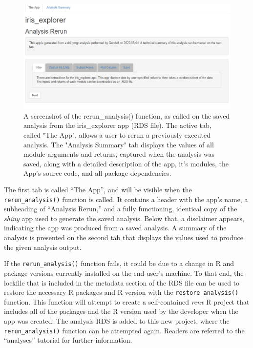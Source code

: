 \begin{figure}
\includegraphics[width=1\linewidth]{images/figure7} \caption{A screenshot of the rerun\_analysis() function, as called on the saved analysis from the iris\_explorer app (RDS file). The active tab, called "The App", allows a user to rerun a previously executed analysis. The "Analysis Summary" tab displays the values of all module arguments and returns, captured when the analysis was saved, along with a detailed description of the app, it's modules, the App's source code, and all package dependencies.}\label{fig:fig7}
\end{figure}

The first tab is called ``The App'', and will be visible when the \texttt{rerun\_analysis()} function is called. It contains a header with the app's name, a subheading of ``Analysis Rerun,'' and a fully functioning, identical copy of the \emph{shiny} app used to generate the saved analysis. Below that, a disclaimer appears, indicating the app was produced from a saved analysis. A summary of the analysis is presented on the second tab that displays the values used to produce the given analysis output.

If the \texttt{rerun\_analysis()} function fails, it could be due to a change in R and package versions currently installed on the end-user's machine. To that end, the lockfile that is included in the metadata section of the RDS file can be used to restore the necessary R packages and R version with the \texttt{restore\_analysis()} function. This function will attempt to create a self-contained \emph{renv} R project that includes all of the packages and the R version used by the developer when the app was created. The analysis RDS is added to this new project, where the \texttt{rerun\_analysis()} function can be attempted again. Readers are referred to the ``analyses'' tutorial for further information.

